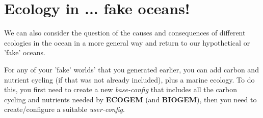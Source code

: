 \newpage


\section{Ecology in ... fake oceans!}

%
We can also consider the question of the causes and consequences of different ecologies in the ocean in a more general way and return to our hypothetical or 'fake' oceans.

For any of your 'fake' worlds' that you generated earlier, you can add carbon and nutrient cycling (if that was not already included), plus a marine ecology. To do this, you first need to create a new \textit{base-config} that includes all the carbon cycling and nutrients needed by \textbf{ECOGEM} (and \textbf{BIOGEM}), then you need to create/configure a suitable \textit{user-config}.

